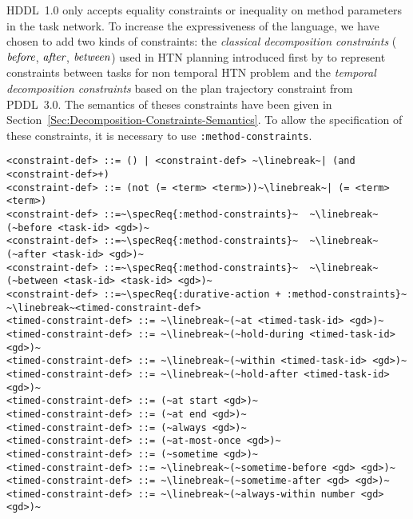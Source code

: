 \documentclass[letterpaper]{article} %
\newcommand{\before}{\text{\it before}}
\newcommand{\after}{\text{\it after}}
\renewcommand{\between}{\text{\it between}}
\begin{document}
%
%
HDDL~1.0 only accepts equality constraints or inequality on method parameters in the task network. To increase the expressiveness of the language, we have chosen to add two kinds of constraints: the {\em classical decomposition constraints} ($\before$, $\after$, $\between$) used in HTN planning introduced first by \citep{erol94} to represent constraints between tasks for non temporal HTN problem and the {\em temporal decomposition constraints} based on the plan trajectory constraint from PDDL~3.0. The semantics of theses constraints have been given in Section~\ref{Sec:Decomposition-Constraints-Semantics}. To allow the specification of these constraints, it is necessary to use \verb+:method-constraints+.

\begin{lstlisting}[firstnumber=last, basicstyle=\fontsize{8.5}{10}\selectfont\ttfamily, escapechar=~]
<constraint-def> ::= () | <constraint-def> ~\linebreak~| (and <constraint-def>+)
<constraint-def> ::= (not (= <term> <term>))~\linebreak~| (= <term> <term>)
<constraint-def> ::=~\specReq{:method-constraints}~  ~\linebreak~(~before <task-id> <gd>)~
<constraint-def> ::=~\specReq{:method-constraints}~  ~\linebreak~(~after <task-id> <gd>)~
<constraint-def> ::=~\specReq{:method-constraints}~  ~\linebreak~(~between <task-id> <task-id> <gd>)~
<constraint-def> ::=~\specReq{:durative-action + :method-constraints}~ ~\linebreak~<timed-constraint-def>
<timed-constraint-def> ::= ~\linebreak~(~at <timed-task-id> <gd>)~
<timed-constraint-def> ::= ~\linebreak~(~hold-during <timed-task-id> <gd>)~
<timed-constraint-def> ::= ~\linebreak~(~within <timed-task-id> <gd>)~
<timed-constraint-def> ::= ~\linebreak~(~hold-after <timed-task-id> <gd>)~
<timed-constraint-def> ::= (~at start <gd>)~
<timed-constraint-def> ::= (~at end <gd>)~
<timed-constraint-def> ::= (~always <gd>)~
<timed-constraint-def> ::= (~at-most-once <gd>)~
<timed-constraint-def> ::= (~sometime <gd>)~
<timed-constraint-def> ::= ~\linebreak~(~sometime-before <gd> <gd>)~
<timed-constraint-def> ::= ~\linebreak~(~sometime-after <gd> <gd>)~
<timed-constraint-def> ::= ~\linebreak~(~always-within number <gd> <gd>)~
\end{lstlisting}
\end{document}

